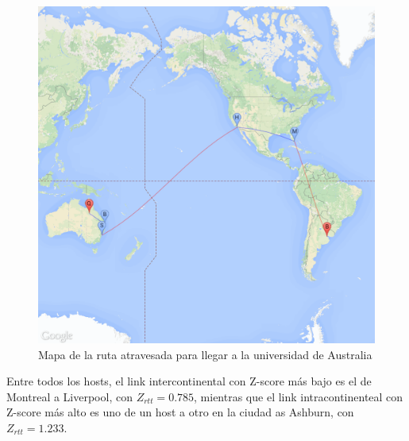 \begin{figure}[H]
	\begin{center}
		  \includegraphics[scale=0.2]{../results/maps/Queensland.png}
		  \caption{Mapa de la ruta atravesada para llegar a la universidad de Australia}
	\end{center}
\end{figure}

Entre todos los hosts, el link intercontinental con Z-score m\'as bajo es el de Montreal a
Liverpool, con $Z_{rtt} = 0.785$, mientras que el link intracontinenteal con Z-score m\'as alto es
uno de un host a otro en la ciudad as Ashburn, con $Z_{rtt} = 1.233$.
